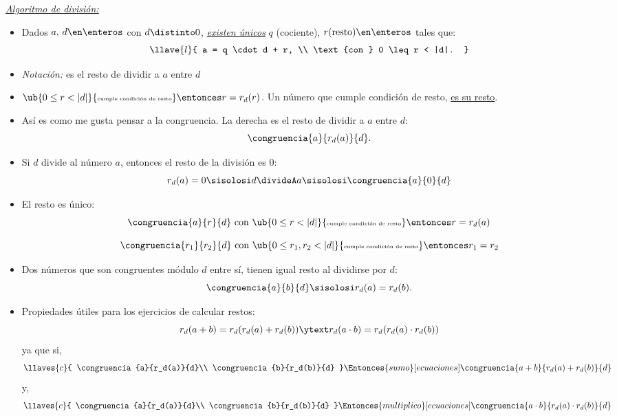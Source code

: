 \textit{\underline{Algoritmo de división:}}\par
\newcommand{\condicionResto}[1]{\ub{0 \leq #1 < |d|}{\text{\tiny cumple condición de resto}}}
\begin{itemize}
  \item
        Dados $a,\, d \en \enteros$ con $d \distinto 0$, \textit{\underline{existen únicos}} $q$ (cociente),
        $r \text{(resto)} \en \enteros$ tales que:
        $$
          \llave{l}{
            a =  q \cdot d + r, \\
            \text{con } 0 \leq r < |d|.
          }
        $$

  \item \textit{Notación: }  es el resto de dividir a $a$ entre $d$

  \item $\condicionResto{r} \entonces r = r_d(r)$. Un número que cumple condición de resto, \underline{es su resto}.

  \item Así es como me gusta pensar a la congruencia. La derecha es el resto de dividir a $a$ entre $d$:
        $$
          \congruencia{a}{r_d(a)}{d}.
        $$

  \item Si $d$ divide al número $a$, entonces el resto de la división es 0:
        $$
          r_d(a) = 0 \sisolosi d \divideA a \sisolosi \congruencia{a}{0}{d}
        $$

  \item El resto es único:
        $$
          \congruencia{a}{r}{d} \text{ con }  \condicionResto{r} \entonces r = r_d(a)
        $$

        $$
          \congruencia{r_1}{r_2}{d} \text{ con } \condicionResto{r_1,r_2} \entonces r_1 = r_2
        $$

  \item Dos números que son congruentes módulo $d$ entre sí, tienen igual resto al dividirse por $d$:
        $$
          \congruencia{a}{b}{d} \sisolosi r_d(a) = r_d(b).
        $$

  \item Propiedades útiles para los ejercicios de calcular restos:
        $$
          r_d(a+b) = r_d(r_d(a) + r_d(b)) \ytext  r_d(a \cdot b) = r_d(r_d(a) \cdot r_d(b))
        $$
        ya que si,
        $$ \llaves{c}{
            \congruencia{a}{r_d(a)}{d}\\
            \congruencia{b}{r_d(b)}{d}
          }
          \Entonces{sumo}[ecuaciones]
          \congruencia{a + b}{r_d(a) + r_d(b)}{d}
        $$
        y,
        $$ \llaves{c}{
            \congruencia{a}{r_d(a)}{d}\\
            \congruencia{b}{r_d(b)}{d}
          }
          \Entonces{multiplico}[ecuaciones]
          \congruencia{a \cdot b}{r_d(a) \cdot r_d(b)}{d}
        $$
\end{itemize}\bigskip

